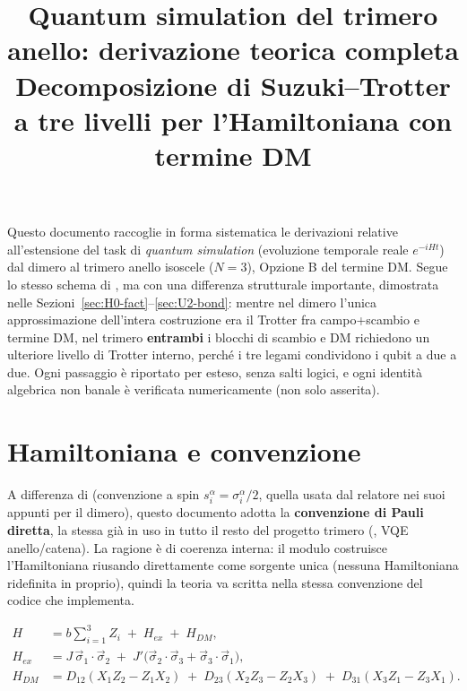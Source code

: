\documentclass[11pt,a4paper]{article}
\title{Quantum simulation del trimero anello: derivazione teorica completa\\
\large Decomposizione di Suzuki--Trotter a tre livelli per l'Hamiltoniana con termine DM}
\author{}
\date{}
\begin{document}
\maketitle
\tableofcontents

\bigskip
\noindent Questo documento raccoglie in forma sistematica le derivazioni relative all'estensione del task di \emph{quantum simulation} (evoluzione temporale reale $e^{-iHt}$) dal dimero al trimero anello isoscele ($N=3$), Opzione B del termine DM. Segue lo stesso schema di \texttt{}, ma con una differenza strutturale importante, dimostrata nelle Sezioni~\ref{sec:H0-fact}--\ref{sec:U2-bond}: mentre nel dimero l'unica approssimazione dell'intera costruzione era il Trotter fra campo+scambio e termine DM, nel trimero \textbf{entrambi} i blocchi di scambio e DM richiedono un ulteriore livello di Trotter interno, perché i tre legami condividono i qubit a due a due. Ogni passaggio è riportato per esteso, senza salti logici, e ogni identità algebrica non banale è verificata numericamente (non solo asserita).

\section{Hamiltoniana e convenzione}
\label{sec:hamiltoniana}

A differenza di \texttt{} (convenzione a spin $s_i^\alpha=\sigma_i^\alpha/2$, quella usata dal relatore nei suoi appunti per il dimero), questo documento adotta la \textbf{convenzione di Pauli diretta}, la stessa già in uso in tutto il resto del progetto trimero (\texttt{}, VQE anello/catena). La ragione è di coerenza interna: il modulo \texttt{} costruisce l'Hamiltoniana riusando direttamente \texttt{} come sorgente unica (nessuna Hamiltoniana ridefinita in proprio), quindi la teoria va scritta nella stessa convenzione del codice che implementa.

\begin{align}
H &= b\sum_{i=1}^3 Z_i \;+\; H_{ex} \;+\; H_{DM}, \label{eq:H-full}\\[4pt]
H_{ex} &= J\,\vec\sigma_1\!\cdot\!\vec\sigma_2 \;+\; J'\big(\vec\sigma_2\!\cdot\!\vec\sigma_3+\vec\sigma_3\!\cdot\!\vec\sigma_1\big), \label{eq:Hex-def}\\[4pt]
H_{DM} &= D_{12}(X_1Z_2{-}Z_1X_2) \;+\; D_{23}(X_2Z_3{-}Z_2X_3) \;+\; D_{31}(X_3Z_1{-}Z_3X_1). \label{eq:HDM-def}
\end{align}
\end{document}
